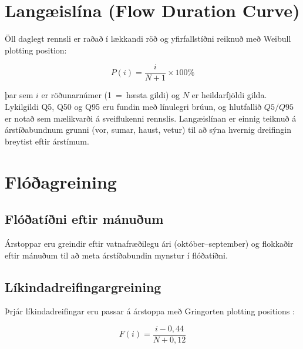 \documentclass[12pt, a4paper]{article}
\begin{document}
\section{Langæislína (Flow Duration Curve)}

Öll daglegt rennsli er raðað í lækkandi röð og yfirfallstíðni reiknuð með
Weibull plotting position:

\begin{equation}
    P(i) = \frac{i}{N+1} \times 100\%
    \label{eq:weibull}
\end{equation}

þar sem $i$ er röðunarnúmer (1~=~hæsta gildi) og $N$ er heildarfjöldi gilda.
Lykilgildi Q5, Q50 og Q95 eru fundin með línulegri brúun, og hlutfallið
$Q5/Q95$ er notað sem mælikvarði á sveiflukenni rennslis. Langæislínan er
einnig teiknuð á árstíðabundnum grunni (vor, sumar, haust, vetur) til að
sýna hvernig dreifingin breytist eftir árstímum.

\section{Flóðagreining}

\subsection{Flóðatíðni eftir mánuðum}

Árstoppar eru greindir eftir vatnafræðilegu ári (október--september) og
flokkaðir eftir mánuðum til að meta árstíðabundin mynstur í flóðatíðni.

\subsection{Líkindadreifingargreining}

Þrjár líkindadreifingar eru passar á árstoppa með Gringorten plotting
positions \cite{Gringorten1963}:

\begin{equation}
    F(i) = \frac{i - 0{,}44}{N + 0{,}12}
    \label{eq:gringorten}
\end{equation}
\end{document}
